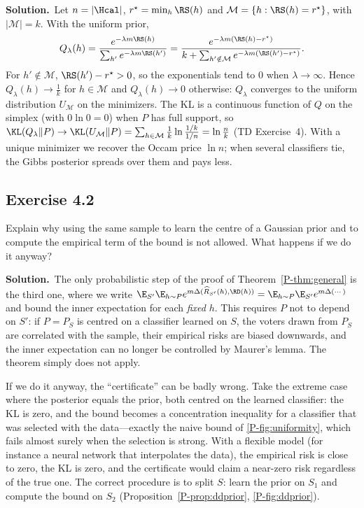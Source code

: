 \documentclass[11pt]{article}
\newcommand{\statement}[1]{\begin{tcolorbox}[enhanced,breakable,colback=black!3,colframe=black!25,boxrule=0.4pt,sharp corners,fontupper=\itshape\small]#1\end{tcolorbox}}
\newcommand{\exo}[1]{\Needspace{6\baselineskip}\subsection*{Exercise #1}\addcontentsline{toc}{subsection}{Exercise #1}}
\newcommand{\sol}{\noindent\textbf{Solution.}\ }
\begin{document}
\sol Let $n=|\Hcal|$, $r^\star=\min_h\RS(h)$ and $\mathcal M=\{h:\RS(h)=r^\star\}$, with $|\mathcal M|=k$. With the uniform prior,
\[
Q_\lambda(h)=\frac{e^{-\lambda m\RS(h)}}{\sum_{h'}e^{-\lambda m\RS(h')}}=\frac{e^{-\lambda m(\RS(h)-r^\star)}}{k+\sum_{h'\notin\mathcal M}e^{-\lambda m(\RS(h')-r^\star)}}.
\]
For $h'\notin\mathcal M$, $\RS(h')-r^\star>0$, so the exponentials tend to $0$ when $\lambda\to\infty$. Hence $Q_\lambda(h)\to\frac1k$ for
$h\in\mathcal M$ and $Q_\lambda(h)\to0$ otherwise: $Q_\lambda$ converges to the uniform distribution $U_{\mathcal M}$ on the
minimizers. The KL is a continuous function of $Q$ on the simplex (with $0\ln0=0$) when $P$ has full support, so
$\KL(Q_\lambda\|P)\to\KL(U_{\mathcal M}\|P)=\sum_{h\in\mathcal M}\frac1k\ln\frac{1/k}{1/n}=\ln\frac nk$ (TD Exercise~4). With a unique minimizer we
recover the Occam price $\ln n$; when several classifiers tie, the Gibbs posterior spreads over them and pays less.

\exo{4.2}
\statement{Explain why using the same sample to learn the centre of a Gaussian prior and to compute the empirical term
of the bound is not allowed. What happens if we do it anyway?}

\sol The only probabilistic step of the proof of Theorem~\ref{P-thm:general} is the third one, where we write
$\E_{S'}\E_{h\sim P}e^{m\Delta(\widehat R_{S'}(h),\RD(h))}=\E_{h\sim P}\E_{S'}e^{m\Delta(\cdots)}$ and bound the inner expectation for each
\emph{fixed} $h$. This requires $P$ not to depend on $S'$: if $P=P_S$ is centred on a classifier learned on $S$, the
voters drawn from $P_S$ are correlated with the sample, their empirical risks are biased downwards, and the inner
expectation can no longer be controlled by Maurer's lemma. The theorem simply does not apply.

If we do it anyway, the ``certificate'' can be badly wrong. Take the extreme case where the posterior equals the prior,
both centred on the learned classifier: the KL is zero, and the bound becomes a concentration inequality for a
classifier that was selected with the data---exactly the naive bound of \cref{P-fig:uniformity}, which fails almost surely
when the selection is strong. With a flexible model (for instance a neural network that interpolates the data),
the empirical risk is close to zero, the KL is zero, and the certificate would claim a near-zero risk regardless of
the true one. The correct procedure is to split $S$: learn the prior on $S_1$ and compute the bound on $S_2$
(Proposition~\ref{P-prop:ddprior}, \cref{P-fig:ddprior}).
\end{document}
